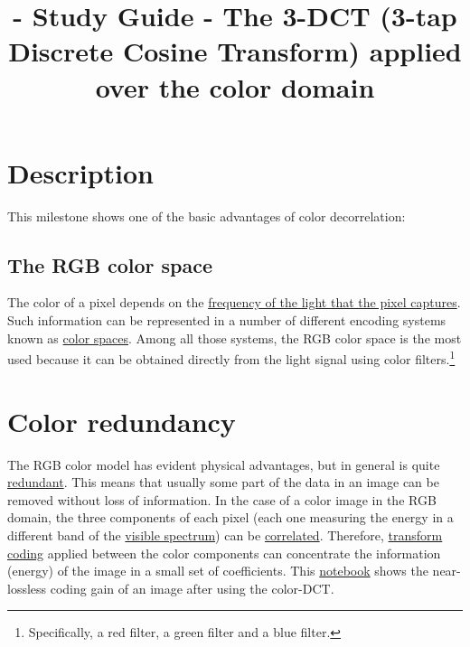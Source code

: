

\title{\SM{} - Study Guide - The 3-DCT (3-tap Discrete Cosine Transform) applied over the color domain}

\maketitle

\tableofcontents

\section{Description}

This milestone shows one of the basic advantages of color decorrelation: 

\subsection{The RGB color space}

The color of a pixel depends on the
\href{https://en.wikipedia.org/wiki/Visible_spectrum}{frequency of the
  light that the pixel captures}. Such information can be represented
in a number of different encoding systems known as
\href{https://en.wikipedia.org/wiki/Color_space}{color spaces}. Among
all those systems, the RGB color space is the most used because it can
be obtained directly from the light signal using color
filters.\footnote{Specifically, a red filter, a green filter and a
blue filter.}


\section{Color redundancy}

The RGB color model has evident physical advantages, but in general is
quite
\href{https://en.wikipedia.org/wiki/Data_redundancy}{redundant}. This
means that usually some part of the data in an image can be removed
without loss of information. In the case of a color image in the RGB
domain, the three components of each pixel (each one measuring the
energy in a different band of the
\href{https://en.wikipedia.org/wiki/Visible_spectrum}{visible
  spectrum}) can be
\href{https://en.wikipedia.org/wiki/Correlation_and_dependence}{correlated}. Therefore,
\href{https://vicente-gonzalez-ruiz.github.io/transform_coding/}{transform
  coding} applied between the color components can concentrate the
information (energy) of the image in a small set of coefficients. This
\href{https://github.com/Sistemas-Multimedia/Sistemas-Multimedia.github.io/blob/master/contents/color_DCT/coding_gain.ipynb}{notebook}
shows the near-lossless coding gain of an image after using the
color-DCT.

